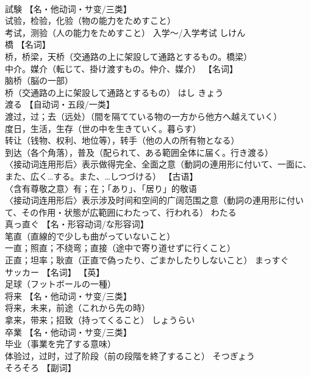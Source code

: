 \documentclass[8pt]{extreport}
\begin{document}
\begin{CJK}{UTF8}{min}
\\	試験	【名・他动词・サ变/三类】 
\\	试验，检验，化验（物の能力をためすこと） 
\\	考试，测验（人の能力をためすこと） 入学～/入学考试	しけん	
\\	橋	【名词】 
\\	桥，桥梁，天桥（交通路の上に架設して通路とするもの。橋梁） 
\\	中介。媒介（転じて、掛け渡すもの。仲介、媒介） 【名词】 
\\	脑桥（脳の一部） 
\\	桥（交通路の上に架設して通路とするもの）	はし きょう	
\\	渡る	【自动词・五段/一类】 
\\	渡过，过；去（远处）（間を隔てている物の一方から他方へ越えていく） 
\\	度日，生活，生存（世の中を生きていく。暮らす） 
\\	转让（钱物、权利、地位等），转手（他の人の所有物となる） 
\\	到达（各个角落），普及（配られて、ある範囲全体に届く。行き渡る） 
\\	〈接动词连用形后〉表示做得完全、全面之意（動詞の連用形に付いて、一面に、また、広く…する。また、…しつづける） 【古语】 
\\	〈含有尊敬之意〉有；在；「あり」、「居り」的敬语 
\\	〈接动词连用形后〉表示涉及时间和空间的广阔范围之意（動詞の連用形に付いて、その作用・状態が広範囲にわたって、行われる）	わたる	
\\	真っ直ぐ	【名・形容动词/な形容词】 
\\	笔直（直線的で少しも曲がっていないこと） 
\\	一直；照直；不绕弯；直接（途中で寄り道せずに行くこと） 
\\	正直；坦率；耿直（正直で偽ったり、ごまかしたりしないこと）	まっすぐ	
\\	サッカー	【名词】 【英】
\\	足球（フットボールの一種）		
\\	将来	【名・他动词・サ变/三类】 
\\	将来，未来，前途（これから先の時） 
\\	拿来，带来；招致（持ってくること）	しょうらい	
\\	卒業	【名・他动词・サ变/三类】 
\\	毕业（事業を完了する意味） 
\\	体验过，过时，过了阶段（前の段階を終了すること）	そつぎょう	
\\	そろそろ	【副词】 

\end{CJK}
\end{document}
